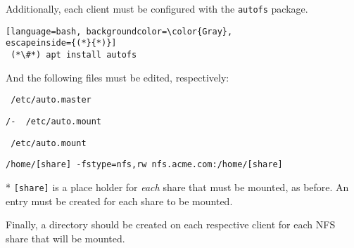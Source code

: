 \noindent
Additionally, each client must be configured with the \lstinline$autofs$ 
package. \\

\begin{lstlisting}[language=bash, backgroundcolor=\color{Gray}, 
escapeinside={(*}{*)}]
 (*\#*) apt install autofs
\end{lstlisting}
\vspace{1em}

\noindent
And the following files must be edited, respectively: \\

\begin{lstlisting}
 /etc/auto.master
\end{lstlisting}
\vspace{1em}

\begin{lstlisting}[backgroundcolor=\color{Gray}]
 /-  /etc/auto.mount
\end{lstlisting}
\vspace{1em}

\begin{lstlisting}
 /etc/auto.mount
\end{lstlisting}
\vspace{1em}

\begin{lstlisting}[backgroundcolor=\color{Gray}]
 /home/[share] -fstype=nfs,rw nfs.acme.com:/home/[share]
\end{lstlisting}
* \lstinline$[share]$ is a place holder for \textit{each} share that must be 
mounted, as before. An entry must be created for each share to be mounted.
\vspace{2em}

\noindent
Finally, a directory should be created on each respective client for each NFS
share that will be mounted. \\
